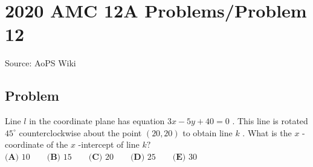 \documentclass[12pt]{article}
\begin{document}
\section*{{2020 AMC 12A Problems/Problem 12}}
Source: AoPS Wiki

\subsection*{Problem}
Line $l$ in the coordinate plane has equation $3x-5y+40=0$ . This line is rotated $45^{\circ}$ counterclockwise about the point $(20,20)$ to obtain line $k$ . What is the $x$ -coordinate of the $x$ -intercept of line $k?$ $\textbf{(A) } 10 \qquad \textbf{(B) } 15 \qquad \textbf{(C) } 20 \qquad \textbf{(D) } 25 \qquad \textbf{(E) } 30$
\end{document}
